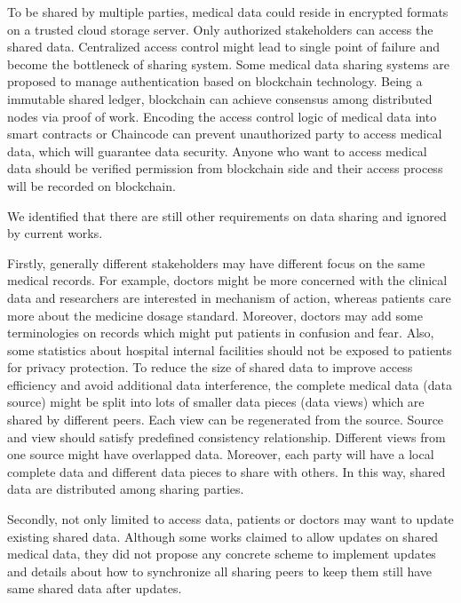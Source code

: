 \documentclass[conference]{IEEEtran}
\begin{document}
To be shared by multiple parties, medical data could reside in encrypted formats on a trusted cloud storage server. Only authorized stakeholders can access the shared data. Centralized access control might lead to single point of failure and become the bottleneck of sharing system. Some medical data sharing systems \cite{azaria2016medrec,fan2018medblock,xia2017bbds} are proposed to manage authentication based on blockchain\cite{nakamoto2008bitcoin} technology. Being a immutable shared ledger, blockchain can achieve consensus among distributed nodes via proof of work. Encoding the access control logic of medical data into smart contracts\cite{azaria2016medrec} or Chaincode \cite{dubovitskaya2017secure} can prevent unauthorized party to access medical data, which will guarantee data security. Anyone who want to access medical data should be verified permission from blockchain side and their access process will be recorded on blockchain.

We identified that there are still other requirements on data sharing and ignored by current works. 

Firstly, generally different stakeholders may have different focus on the same medical records. For example, doctors might be more concerned with the clinical data and researchers are interested in mechanism of action, whereas patients care more about the medicine dosage standard. Moreover, doctors may add some terminologies on records which might put patients in confusion and fear. Also, some statistics about hospital internal facilities should not be exposed to patients for privacy protection.  To reduce the size of shared data to improve access efficiency and avoid additional data interference, the complete medical data (data source) might be split into lots of smaller data pieces (data views) which are shared by different peers. Each view can be regenerated from the source. Source and view should satisfy predefined consistency relationship. Different views from one source might have overlapped data. Moreover, each party will have a local complete data and different data pieces to share with others. In this way, shared data are distributed among sharing parties.

Secondly, not only limited to access data, patients or doctors may want to update existing shared data. Although some works \cite{azaria2016medrec} claimed to allow updates on shared medical data, they did not propose any concrete scheme to implement updates and details about how to synchronize all sharing peers to keep them still have same shared data after updates.
\end{document}
